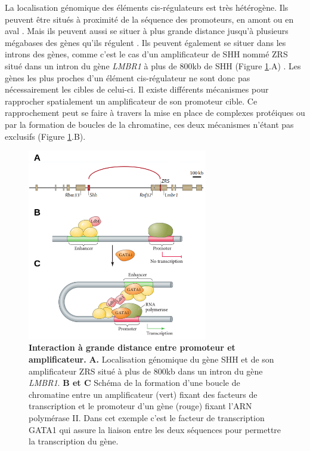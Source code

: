 La localisation génomique des éléments \gls{cis}-régulateurs est très hétérogène. Ils peuvent être situés à proximité de la séquence des promoteurs, en amont ou en aval \citep{maniatis_regulation_1987}. Mais ils peuvent aussi se situer à plus grande distance jusqu’à plusieurs mégabases des gènes qu’ils régulent \citep{visel_chip-seq_2009}. Ils peuvent également se situer dans les introns des gènes, comme c’est le cas d’un \gls{amplificateur} de \acrshort{SHH} nommé \acrshort{ZRS} situé dans un intron du gène \textit{LMBR1} à plus de 800kb de \acrshort{SHH} (Figure \ref{fig:Fig6}.A) \citep{lettice_long-range_2003}. Les gènes les plus proches d’un élément \gls{cis}-régulateur ne sont donc pas nécessairement les cibles de celui-ci. Il existe différents mécanismes pour rapprocher spatialement un \gls{amplificateur} de son promoteur cible. Ce rapprochement peut se faire à travers la mise en place de complexes protéiques ou par la formation de boucles de la chromatine, ces deux mécanismes n’étant pas exclusifs (Figure \ref{fig:Fig6}.B).\\

\begin{figure}[h]
 \centering
 \includegraphics[width=0.7\textwidth, page=1] {figures/introduction/fig6.png}
 \caption[Interaction à grande distance entre promoteur et \gls{amplificateur}.]{
 \textbf{Interaction à grande distance entre promoteur et \gls{amplificateur}.}
 \textbf{A.} Localisation génomique du gène \acrshort{SHH} et de son \gls{amplificateur} \acrshort{ZRS} situé à plus de 800kb dans un intron du gène \textit{LMBR1}.
 \textbf{B et C} Schéma de la formation d'une boucle de chromatine entre un \gls{amplificateur} (vert) fixant des facteurs de transcription et le promoteur d'un gène (rouge) fixant l'\acrshort{ARN} polymérase II. Dans cet exemple c'est le facteur de transcription GATA1 qui assure la liaison entre les deux séquences pour permettre la transcription du gène.\\
 }
 \label{fig:Fig6}
\end{figure}

